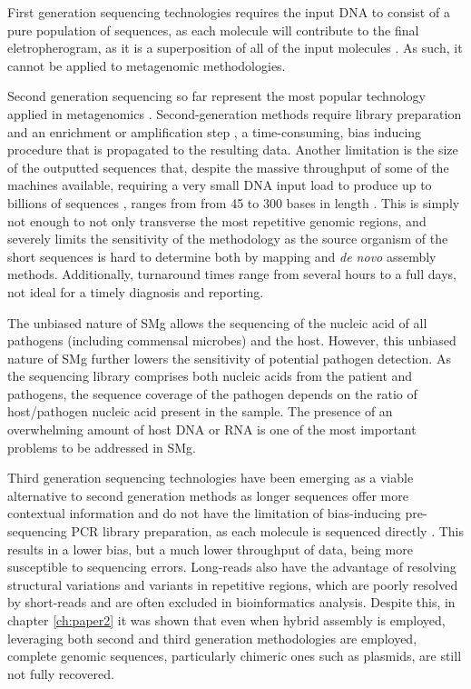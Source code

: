 First generation sequencing technologies requires the input \ac{DNA} to consist of a pure population of sequences, as each molecule will contribute to the final eletropherogram, as it is a superposition of all of the input molecules \citep{hagemann_overview_2015}. As such, it cannot be applied to metagenomic methodologies. 

Second generation sequencing so far represent the most popular technology applied in metagenomics \citep{rossen_practical_2018, loman_twenty_2015, loman_high-throughput_2012}. Second-generation methods require library preparation and an enrichment or amplification step \citep{hagemann_overview_2015}, a time-consuming, bias inducing procedure that is propagated to the resulting data. Another limitation is the size of the outputted sequences that, despite the massive throughput of some of the machines available, requiring a very small \ac{DNA} input load to produce up to billions of sequences \citep{loman_twenty_2015}, ranges from from 45 to 300 bases in length \citep{loman_performance_2012}. This is simply not enough to not only transverse the most repetitive genomic regions, and severely limits the sensitivity of the methodology as the source organism of the short sequences is hard to determine both by mapping and \textit{de novo} assembly methods. Additionally, turnaround times range from several hours to a full days, not ideal for a timely diagnosis and reporting.

The unbiased nature of \ac{SMg} allows the sequencing of the nucleic acid of all pathogens (including commensal microbes) and the host. However, this unbiased nature of SMg further lowers the sensitivity of potential pathogen detection. As the sequencing library comprises both nucleic acids from the patient and pathogens, the sequence coverage of the pathogen depends on the ratio of host/pathogen nucleic acid present in the sample. The presence of an overwhelming amount of host \ac{DNA} or \ac{RNA} is one of the most important problems to be addressed in \ac{SMg}.

Third generation sequencing technologies have been emerging as a viable alternative to second generation methods as longer sequences offer more contextual information and do not have the limitation of bias-inducing pre-sequencing \ac{PCR} library preparation, as each molecule is sequenced directly \citep{loman_twenty_2015}. This results in a lower bias, but a much lower throughput of data, being more susceptible to sequencing errors. Long-reads also have the advantage of resolving structural variations and variants in repetitive regions, which are poorly resolved by short-reads and are often excluded in bioinformatics analysis. Despite this, in chapter \ref{ch:paper2} it was shown that even when hybrid assembly is employed, leveraging both second and third generation methodologies are employed, complete genomic sequences, particularly chimeric ones such as plasmids, are still not fully recovered. 


